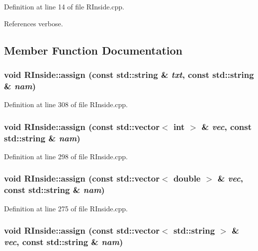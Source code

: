 Definition at line 14 of file RInside.cpp.

References verbose.

\subsection{Member Function Documentation}
\hypertarget{classRInside_a7073300c48c03478361b881e2d307ad6}{
\subsubsection[{assign}]{\setlength{\rightskip}{0pt plus 5cm}void RInside::assign (const std::string \& {\em txt}, \/  const std::string \& {\em nam})}}
\label{classRInside_a7073300c48c03478361b881e2d307ad6}


Definition at line 308 of file RInside.cpp.\hypertarget{classRInside_ab13e05865dec061ba1def1d922d2a58c}{
\subsubsection[{assign}]{\setlength{\rightskip}{0pt plus 5cm}void RInside::assign (const std::vector$<$ int $>$ \& {\em vec}, \/  const std::string \& {\em nam})}}
\label{classRInside_ab13e05865dec061ba1def1d922d2a58c}


Definition at line 298 of file RInside.cpp.\hypertarget{classRInside_a9086ea21bd4a47d9411c6451c1ae50f5}{
\subsubsection[{assign}]{\setlength{\rightskip}{0pt plus 5cm}void RInside::assign (const std::vector$<$ double $>$ \& {\em vec}, \/  const std::string \& {\em nam})}}
\label{classRInside_a9086ea21bd4a47d9411c6451c1ae50f5}


Definition at line 275 of file RInside.cpp.\hypertarget{classRInside_a7c5cb94cc703541037e6acf243dc2b1b}{
\subsubsection[{assign}]{\setlength{\rightskip}{0pt plus 5cm}void RInside::assign (const std::vector$<$ std::string $>$ \& {\em vec}, \/  const std::string \& {\em nam})}}
\label{classRInside_a7c5cb94cc703541037e6acf243dc2b1b}


